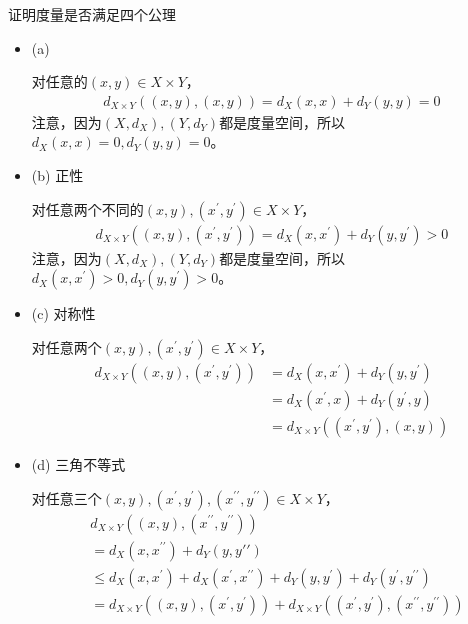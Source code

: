\documentclass{article}
\begin{document}
证明度量是否满足四个公理
\begin{itemize}
  \item (a)

        对任意的$(x, y) \in X \times Y$，
        \begin{align*}
          d_{X \times Y}((x, y), (x, y)) = d_X(x, x) + d_Y(y, y) = 0
        \end{align*}
        注意，因为$(X, d_X), (Y, d_Y)$都是度量空间，所以$d_X(x, x) = 0, d_Y(y, y) = 0$。

  \item (b) 正性

        对任意两个不同的$(x, y), (x^\prime, y^\prime) \in X \times Y$，
        \begin{align*}
          d_{X \times Y}((x, y), (x^\prime, y^\prime)) = d_X(x, x^\prime) + d_Y(y, y^\prime) > 0
        \end{align*}
        注意，因为$(X, d_X), (Y, d_Y)$都是度量空间，所以$d_X(x, x^\prime) > 0, d_Y(y, y^\prime) > 0$。

  \item (c) 对称性

        对任意两个$(x, y), (x^\prime, y^\prime) \in X \times Y$，
        \begin{align*}
          d_{X \times Y}((x, y), (x^\prime, y^\prime)) & = d_X(x, x^\prime) + d_Y(y, y^\prime)          \\
                                                       & = d_X(x^\prime, x) + d_Y(y^\prime, y)          \\
                                                       & = d_{X \times Y}((x^\prime, y^\prime), (x, y))
        \end{align*}

  \item (d) 三角不等式

        对任意三个$(x, y), (x^\prime, y^\prime), (x^{\prime \prime}, y^{\prime \prime}) \in X \times Y$，
        \begin{align*}
           & d_{X \times Y}((x, y), (x^{\prime \prime}, y^{\prime \prime}))                                                                        \\
           & = d_X(x, x^{\prime \prime}) + d_Y(y,y{\prime \prime})                                                                                 \\
           & \leq d_X(x, x^{\prime}) + d_X(x^{\prime}, x^{\prime \prime}) + d_Y(y, y^{\prime}) + d_Y(y^{\prime}, y^{\prime \prime})                \\
           & = d_{X \times Y}((x, y), (x^{\prime}, y^{\prime})) + d_{X \times Y}((x^{\prime}, y^{\prime}), (x^{\prime \prime}, y^{\prime \prime}))
        \end{align*}
\end{itemize}
\end{document}
